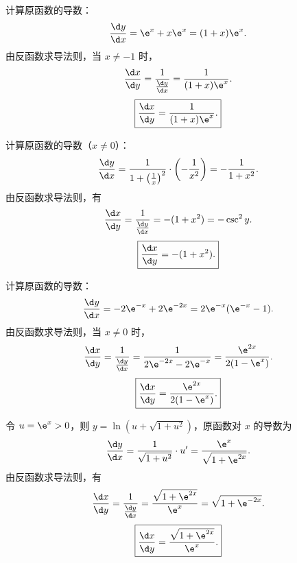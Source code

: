 \begin{solution}

    计算原函数的导数：
    \begin{equation}
        \frac{\d y}{\d x} = \e^x + x\e^x = (1 + x)\e^x.
    \end{equation}
    由反函数求导法则，当 $x \neq -1$ 时，
    \begin{equation}
        \frac{\d x}{\d y} = \frac{1}{\frac{\d y}{\d x}} = \frac{1}{(1+x)\e^x}.
    \end{equation}
    \begin{equation}
        \boxed{\frac{\d x}{\d y} = \frac{1}{(1+x)\e^x}.}
    \end{equation}


    计算原函数的导数（$x \neq 0$）：
    \begin{equation}
        \frac{\d y}{\d x} = \frac{1}{1 + \left(\frac{1}{x}\right)^2} \cdot \left( -\frac{1}{x^2} \right) = -\frac{1}{1 + x^2}.
    \end{equation}
    由反函数求导法则，有
    \begin{equation}
        \frac{\d x}{\d y} = \frac{1}{\frac{\d y}{\d x}} = -(1 + x^2) = -\csc^2 y.
    \end{equation}
    \begin{equation}
        \boxed{\frac{\d x}{\d y} = -(1 + x^2).}
    \end{equation}


    计算原函数的导数：
    \begin{equation}
        \frac{\d y}{\d x} = -2\e^{-x} + 2\e^{-2x} = 2\e^{-x}(\e^{-x} - 1).
    \end{equation}
    由反函数求导法则，当 $x \neq 0$ 时，
    \begin{equation}
        \frac{\d x}{\d y} = \frac{1}{\frac{\d y}{\d x}} = \frac{1}{2\e^{-2x} - 2\e^{-x}} = \frac{\e^{2x}}{2(1 - \e^x)}.
    \end{equation}
    \begin{equation}
        \boxed{\frac{\d x}{\d y} = \frac{\e^{2x}}{2(1 - \e^x)}.}
    \end{equation}


    令 $u = \e^x > 0$，则 $y = \ln(u + \sqrt{1+u^2})$，原函数对 $x$ 的导数为
    \begin{equation}
        \frac{\d y}{\d x} = \frac{1}{\sqrt{1 + u^2}} \cdot u' = \frac{\e^x}{\sqrt{1 + \e^{2x}}}.
    \end{equation}
    由反函数求导法则，有
    \begin{equation}
        \frac{\d x}{\d y} = \frac{1}{\frac{\d y}{\d x}} = \frac{\sqrt{1 + \e^{2x}}}{\e^x} = \sqrt{1 + \e^{-2x}}.
    \end{equation}
    \begin{equation}
        \boxed{\frac{\d x}{\d y} = \frac{\sqrt{1+\e^{2x}}}{\e^x}.}
    \end{equation}
\end{solution}

